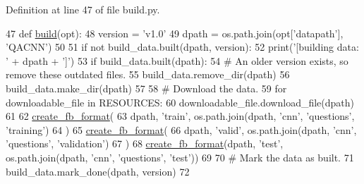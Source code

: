 Definition at line 47 of file build.\+py.


\begin{DoxyCode}
47 \textcolor{keyword}{def }\hyperlink{namespacedialog__babi__feedback_1_1build_a7a9d289f7493a5ded13c4b7f071b6184}{build}(opt):
48     version = \textcolor{stringliteral}{'v1.0'}
49     dpath = os.path.join(opt[\textcolor{stringliteral}{'datapath'}], \textcolor{stringliteral}{'QACNN'})
50 
51     \textcolor{keywordflow}{if} \textcolor{keywordflow}{not} build\_data.built(dpath, version):
52         print(\textcolor{stringliteral}{'[building data: '} + dpath + \textcolor{stringliteral}{']'})
53         \textcolor{keywordflow}{if} build\_data.built(dpath):
54             \textcolor{comment}{# An older version exists, so remove these outdated files.}
55             build\_data.remove\_dir(dpath)
56         build\_data.make\_dir(dpath)
57 
58         \textcolor{comment}{# Download the data.}
59         \textcolor{keywordflow}{for} downloadable\_file \textcolor{keywordflow}{in} RESOURCES:
60             downloadable\_file.download\_file(dpath)
61 
62         \hyperlink{namespaceparlai_1_1tasks_1_1wikiqa_1_1build_a554828702769592403db58c955d1dfe3}{create\_fb\_format}(
63             dpath, \textcolor{stringliteral}{'train'}, os.path.join(dpath, \textcolor{stringliteral}{'cnn'}, \textcolor{stringliteral}{'questions'}, \textcolor{stringliteral}{'training'})
64         )
65         \hyperlink{namespaceparlai_1_1tasks_1_1wikiqa_1_1build_a554828702769592403db58c955d1dfe3}{create\_fb\_format}(
66             dpath, \textcolor{stringliteral}{'valid'}, os.path.join(dpath, \textcolor{stringliteral}{'cnn'}, \textcolor{stringliteral}{'questions'}, \textcolor{stringliteral}{'validation'})
67         )
68         \hyperlink{namespaceparlai_1_1tasks_1_1wikiqa_1_1build_a554828702769592403db58c955d1dfe3}{create\_fb\_format}(dpath, \textcolor{stringliteral}{'test'}, os.path.join(dpath, \textcolor{stringliteral}{'cnn'}, \textcolor{stringliteral}{'questions'}, \textcolor{stringliteral}{'test'}))
69 
70         \textcolor{comment}{# Mark the data as built.}
71         build\_data.mark\_done(dpath, version)
72 \end{DoxyCode}
\mbox{\label{namespaceparlai_1_1tasks_1_1qacnn_1_1build_add8d5f440ef973d77d8f63cc11197dce}} 
